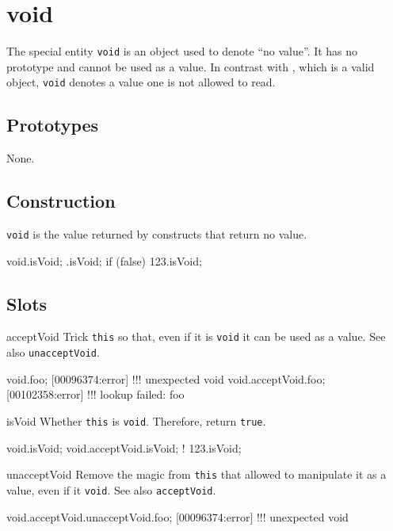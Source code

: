 
\section{void}

The special entity \lstinline|void| is an object used to denote ``no
value''.  It has no prototype and cannot be used as a value.  In
contrast with , which is a valid object,
\lstinline|void| denotes a value one is not allowed to read.

\subsection{Prototypes}

None.

\subsection{Construction}

\lstinline|void| is the value returned by constructs that return no
value.

\begin{urbiassert}[firstnumber=1]
void.isVoid;
{}.isVoid;
{if (false) 123}.isVoid;
\end{urbiassert}

\subsection{Slots}

\begin{urbiscriptapi}
\item[acceptVoid]
  Trick \lstinline|this| so that, even if it is \lstinline|void| it
  can be used as a value.  See also \lstinline|unacceptVoid|.
\begin{urbiscript}
void.foo;
[00096374:error] !!! unexpected void
void.acceptVoid.foo;
[00102358:error] !!! lookup failed: foo
\end{urbiscript}

\item[isVoid]
  Whether \lstinline|this| is \lstinline|void|.  Therefore, return
  \lstinline|true|.
\begin{urbiassert}
void.isVoid;
void.acceptVoid.isVoid;
! 123.isVoid;
\end{urbiassert}

\item[unacceptVoid]
  Remove the magic from \lstinline|this| that allowed to manipulate it
  as a value, even if it \lstinline|void|.  See also
  \lstinline|acceptVoid|.
\begin{urbiscript}
void.acceptVoid.unacceptVoid.foo;
[00096374:error] !!! unexpected void
\end{urbiscript}

\end{urbiscriptapi}




